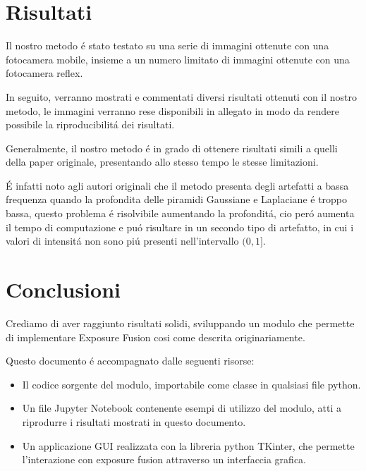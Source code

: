 \documentclass[10pt,journal,cspaper,compsoc]{IEEEtran}
\begin{document}
\section{Risultati}

Il nostro metodo é stato testato su una serie di immagini ottenute con una fotocamera mobile, insieme 
a un numero limitato di immagini ottenute con una fotocamera reflex. 

In seguito, verranno mostrati e commentati diversi risultati ottenuti con il nostro metodo, le immagini 
verranno rese disponibili in allegato in modo da rendere possibile la riproducibilitá dei risultati.

Generalmente, il nostro metodo é in grado di ottenere risultati simili a quelli della paper originale, 
presentando allo stesso tempo le stesse limitazioni.

É infatti noto agli autori originali che il metodo 
presenta degli artefatti a bassa frequenza quando la profondita delle piramidi Gaussiane e Laplaciane é troppo 
bassa, questo problema é risolvibile aumentando la profonditá, cio peró aumenta il tempo di computazione e 
puó risultare in un secondo tipo di artefatto, in cui i valori di intensitá non sono piú presenti nell'intervallo $(0, 1]$.

\section{Conclusioni}

Crediamo di aver raggiunto risultati solidi, sviluppando un modulo che permette di implementare Exposure Fusion 
cosi come descrita originariamente. 

Questo documento é accompagnato dalle seguenti risorse:

\begin{itemize}
    \item Il codice sorgente del modulo, importabile come classe in qualsiasi file python.
    \item Un file Jupyter Notebook contenente esempi di utilizzo del modulo, atti a riprodurre 
    i risultati mostrati in questo documento.
    \item Un applicazione GUI realizzata con la libreria python TKinter, che permette l'interazione     
    con exposure fusion attraverso un interfaccia grafica.
\end{itemize}



\end{document}
